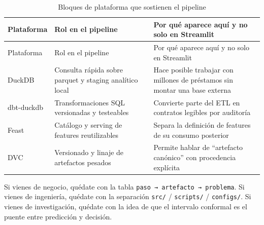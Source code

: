\documentclass[
  spanish,
  11pt,
  letterpaper,
]{scrbook}
\theoremstyle{plain}
\theoremstyle{remark}
\begin{document}
\begin{longtable}[]{@{}
  >{\raggedright\arraybackslash}p{}
  >{\raggedright\arraybackslash}p{}
  >{\raggedright\arraybackslash}p{}@{}}
\caption{Bloques de plataforma que sostienen el
pipeline}\label{tbl-pipeline-platform}\tabularnewline
\toprule\noalign{}
\begin{minipage}[b]{\linewidth}\raggedright
Plataforma
\end{minipage} & \begin{minipage}[b]{\linewidth}\raggedright
Rol en el pipeline
\end{minipage} & \begin{minipage}[b]{\linewidth}\raggedright
Por qué aparece aquí y no solo en Streamlit
\end{minipage} \\
\midrule\noalign{}
\endfirsthead
\toprule\noalign{}
\begin{minipage}[b]{\linewidth}\raggedright
Plataforma
\end{minipage} & \begin{minipage}[b]{\linewidth}\raggedright
Rol en el pipeline
\end{minipage} & \begin{minipage}[b]{\linewidth}\raggedright
Por qué aparece aquí y no solo en Streamlit
\end{minipage} \\
\midrule\noalign{}
\endhead
\bottomrule\noalign{}
\endlastfoot
DuckDB & Consulta rápida sobre parquet y staging analítico local & Hace
posible trabajar con millones de préstamos sin montar una base
externa \\
dbt-duckdb & Transformaciones SQL versionadas y testeables & Convierte
parte del ETL en contratos legibles por auditoría \\
Feast & Catálogo y serving de features reutilizables & Separa la
definición de features de su consumo posterior \\
DVC & Versionado y linaje de artefactos pesados & Permite hablar de
``artefacto canónico'' con procedencia explícita \\
\end{longtable}

\begin{tcolorbox}[enhanced jigsaw, arc=.35mm, bottomrule=.15mm, bottomtitle=1mm, breakable, colback=white, colbacktitle=quarto-callout-note-color!10!white, colframe=quarto-callout-note-color-frame, coltitle=black, left=2mm, leftrule=.75mm, opacityback=0, opacitybacktitle=0.6, rightrule=.15mm, title=\textcolor{quarto-callout-note-color}{\faInfo}\hspace{0.5em}{Cómo leer esta parte}, titlerule=0mm, toprule=.15mm, toptitle=1mm]

Si vienes de negocio, quédate con la tabla
\texttt{paso\ →\ artefacto\ →\ problema}. Si vienes de ingeniería,
quédate con la separación \texttt{src/} / \texttt{scripts/} /
\texttt{configs/}. Si vienes de investigación, quédate con la idea de
que el intervalo conformal es el puente entre predicción y decisión.

\end{tcolorbox}
\end{document}
